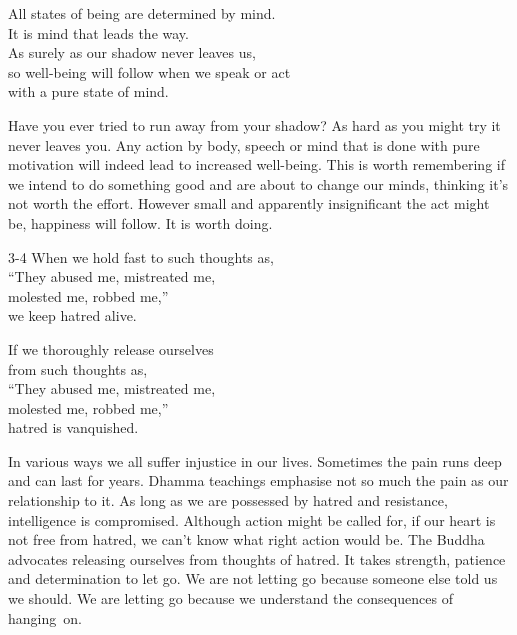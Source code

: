 
\begin{dhpVerse}{2}
\label{dhp-2}
All states of being are determined by mind.\\
It is mind that leads the way.\\
As surely as our shadow never leaves us,\\
so well-being will follow when we speak or act\\
with a pure state of mind.
\end{dhpVerse}

\begin{dhpRefl}

Have you ever tried to run away from your shadow? As hard as you
might try it never leaves you. Any action by body, speech or mind
that is done with pure motivation will indeed lead to increased
well-being. This is worth remembering if we intend to do something
good and are about to change our minds, thinking it's not worth the
effort. However small and apparently insignificant the act might be,
happiness will follow. It is worth doing.

\end{dhpRefl}


\begin{dhpVerse}{3-4}
\label{dhp-3}\label{dhp-4}
When we hold fast to such thoughts as,\\
``They abused me, mistreated me,\\
molested me, robbed me,''\\
we keep hatred alive.

If we thoroughly release ourselves\\
from such thoughts as,\\
``They abused me, mistreated me,\\
molested me, robbed me,''\\
hatred is vanquished.
\end{dhpVerse}

\begin{dhpRefl}

In various ways we all suffer injustice in our lives. Sometimes the
pain runs deep and can last for years. Dhamma teachings emphasise not
so much the pain as our relationship to it. As long as we are
possessed by hatred and resistance, intelligence is compromised.
Although action might be called for, if our heart is not free from
hatred, we can't know what right action would be. The Buddha
advocates releasing ourselves from thoughts of hatred. It takes
strength, patience and determination to let go. We are not letting go
because someone else told us we should. We are letting go because we
understand the consequences of hanging~on.

\end{dhpRefl}

